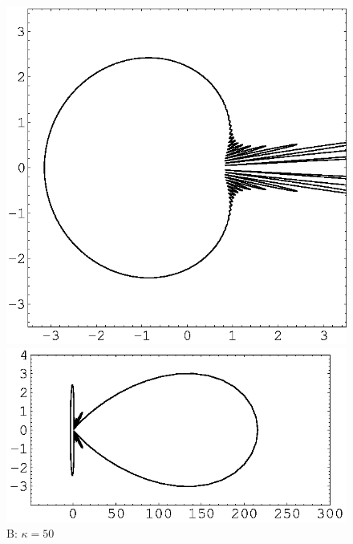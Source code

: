 \documentclass[12pt]{article}
\begin{document}
\begin{figure}[p]
\begin{center}
\includegraphics[scale=0.5]{./B2.eps}\includegraphics[scale=0.9]{./B1.eps}\\ 
{\footnotesize B: $\kappa=50$}\\
\vspace{2mm}

\end{center}
\end{figure}
\end{document}
